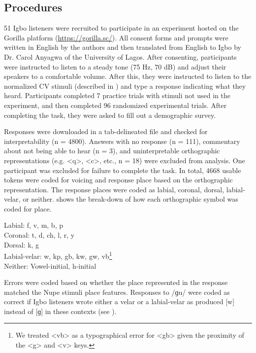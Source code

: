 \documentclass[output=paper,colorlinks,citecolor=brown
]{langscibook}
\begin{document}
\subsection{Procedures}\label{sec:burnsshaw:Procedures}
51 Igbo listeners were recruited to participate in an experiment hosted on the Gorilla platform (\href{https://gorilla.sc/}{https://gorilla.sc/}). All consent forms and prompts were written in English by the authors and then translated from English to Igbo by Dr. Carol Anyagwa of the University of Lagos. After consenting, participants were instructed to listen to a steady tone (75 Hz, 70 dB) and adjust their speakers to a comfortable volume. After this, they were instructed to listen to the normalized CV stimuli (described in ) and type a response indicating what they heard. Participants completed 7 practice trials with stimuli not used in the experiment, and then completed 96 randomized experimental trials. After completing the task, they were asked to fill out a demographic survey.

Responses were downloaded in a tab-delineated file and checked for interpretability (n = 4800). Answers with no response (n = 111), commentary about not being able to hear (n = 3), and uninterpretable orthographic representations (e.g. <q>, <c>, etc., n = 18) were excluded from analysis. One participant was excluded for failure to complete the task. In total, 4668 usable tokens were coded for voicing and response place based on the orthographic representation. The response places were coded as labial, coronal, dorsal, labial-velar, or neither.  shows the break-down of how each orthographic symbol was coded for place.

\ea\label{ex:burnsshaw:placelabels}
Labial: f, v, m, b, p\\
Coronal: t, d, ch, l, r, y\\
Dorsal: k, g\\
Labial-velar: w, kp, gb, kw, gw, vb\footnote{We treated <vb> as a typographical error for <gb> given the proximity of the <g> and <v> keys.}\\
Neither: Vowel-initial, h-initial
\z
	
\noindent Errors were coded based on whether the place represented in the response matched the Nupe stimuli place features. Responses to /ɡu/ were coded as correct if Igbo listeners wrote either a velar or a labial-velar as \citeauthor{Kawu} produced [w] instead of [ɡ] in these contexts (see ).
\end{document}
